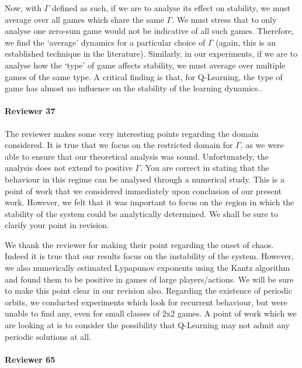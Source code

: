 \documentclass{article}
\begin{document}
Now, with $\Gamma$ defined as such, if we are to analyse its effect on stability, we must average
over all games which share the same $\Gamma$. We must stress that to only analyse one zero-sum game would not be indicative of all such games. Therefore, we find the `average' dynamics for a particular choice of $\Gamma$ (again, this is an established technique in the literature). Similarly, in our experiments, if we are to analyse how the `type' of game
affects stability, we must average over multiple games of the same type. A critical finding is that, for
Q-Learning, the type of game has almost no influence on the stability of the learning dynamics..


\paragraph{Reviewer 37} %
\label{par:reviewer_37}

The reviewer makes some very interesting points regarding the domain considered. It is true that we focus on the restricted domain for
$\Gamma$, as we were able to ensure that our theoretical analysis was sound.
Unfortunately, the analysis does not extend to positive $\Gamma$. You are correct in stating that the behaviour in this regime can be analysed through a numerical study. This is a point of work that we considered immediately upon conclusion of our present work. However, we felt that it was important to focus on the region in which the stability of the system could be analytically determined. We shall be sure to clarify your point in revision.

We thank the reviewer for making their point regarding the onset of chaos. Indeed it
is true that our results focus on the instability of the system. However, we also numerically
estimated Lypapunov exponents using the Kantz algorithm and found them to be positive in games of large players/actions. We will be sure to make this point clear in our revision also.
Regarding the existence of periodic orbits, we conducted experiments which look for recurrent
behaviour, but were unable to find any, even for small classes of 2x2 games. A point of work which
we are looking at is to consider the possibility that Q-Learning may not admit any
periodic solutions at all.


\paragraph{Reviewer 65} %
\label{par:reviewer_65}
\end{document}
